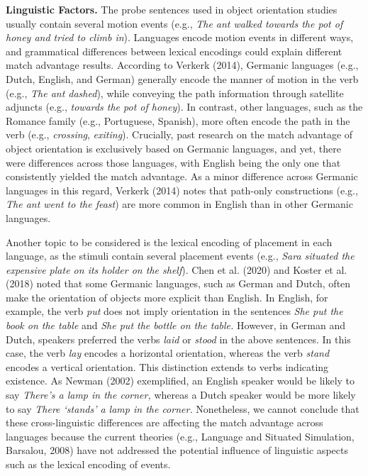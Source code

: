 \documentclass[
  man,floatsintext]{apa7}
\begin{document}
\textbf{Linguistic Factors.} The probe sentences used in object orientation
studies usually contain several motion events (e.g., \emph{The ant walked
towards the pot of honey and tried to climb in}). Languages encode
motion events in different ways, and grammatical differences between
lexical encodings could explain different match advantage results.
According to Verkerk (2014), Germanic languages (e.g., Dutch, English, and
German) generally encode the manner of motion in the verb (e.g., \emph{The
ant dashed}), while conveying the path information through satellite
adjuncts (e.g., \emph{towards the pot of honey}). In contrast, other
languages, such as the Romance family (e.g., Portuguese, Spanish), more
often encode the path in the verb (e.g., \emph{crossing}, \emph{exiting}).
Crucially, past research on the match advantage of object orientation is
exclusively based on Germanic languages, and yet, there were differences
across those languages, with English being the only one that
consistently yielded the match advantage. As a minor difference across
Germanic languages in this regard, Verkerk (2014) notes that path-only
constructions (e.g., \emph{The ant went to the feast}) are more common in
English than in other Germanic languages.

Another topic to be considered is the lexical encoding of placement in
each language, as the stimuli contain several placement events (e.g.,
\emph{Sara situated the expensive plate on its holder on the shelf}).
Chen et al. (2020) and Koster et al. (2018) noted that
some Germanic languages, such as German and Dutch, often make the
orientation of objects more explicit than English. In English, for
example, the verb \emph{put} does not imply orientation in the sentences \emph{She
put the book on the table} and \emph{She put the bottle on the table.}
However, in German and Dutch, speakers preferred the verbs \emph{laid} or
\emph{stood} in the above sentences. In this case, the verb \emph{lay} encodes a
horizontal orientation, whereas the verb \emph{stand} encodes a vertical
orientation. This distinction extends to verbs indicating existence. As
Newman (2002) exemplified, an English
speaker would be likely to say \emph{There's a lamp in the corner,} whereas a
Dutch speaker would be more likely to say \emph{There `stands' a lamp in the
corner.} Nonetheless, we cannot conclude that these cross-linguistic
differences are affecting the match advantage across languages because
the current theories (e.g., Language and Situated Simulation, Barsalou, 2008) have not addressed the potential influence of
linguistic aspects such as the lexical encoding of events.
\end{document}

